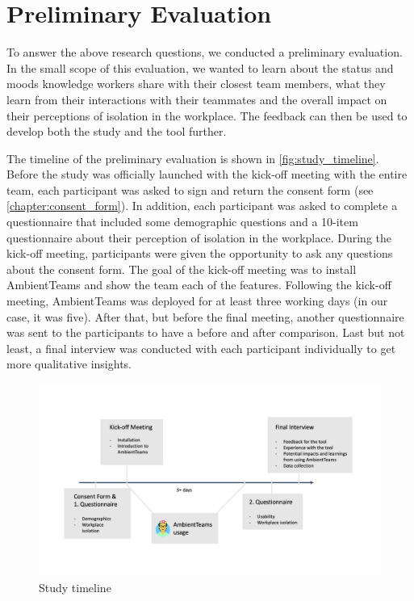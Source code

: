 \chapter{Preliminary Evaluation}
\label{chapter:preliminary_evaluation}
To answer the above research questions, we conducted a preliminary evaluation. In the small scope of this evaluation, we wanted to learn about the status and moods knowledge workers share with their closest team members, what they learn from their interactions with their teammates and the overall impact on their perceptions of isolation in the workplace. The feedback can then be used to develop both the study and the tool further.

The timeline of the preliminary evaluation is shown in \autoref{fig:study_timeline}. Before the study was officially launched with the kick-off meeting with the entire team, each participant was asked to sign and return the consent form (see \autoref{chapter:consent_form}). In addition, each participant was asked to complete a questionnaire that included some demographic questions and a 10-item questionnaire about their perception of isolation in the workplace. During the kick-off meeting, participants were given the opportunity to ask any questions about the consent form. The goal of the kick-off meeting was to install AmbientTeams and show the team each of the features. Following the kick-off meeting, AmbientTeams was deployed for at least three working days (in our case, it was five). After that, but before the final meeting, another questionnaire was sent to the participants to have a before and after comparison. Last but not least, a final interview was conducted with each participant individually to get more qualitative insights.

\begin{figure}[h]
    \centering
    \includegraphics[width=.8\linewidth]{./images/Study_Timeline.png}
    \caption{Study timeline}
    \label{fig:study_timeline}
\end{figure}

